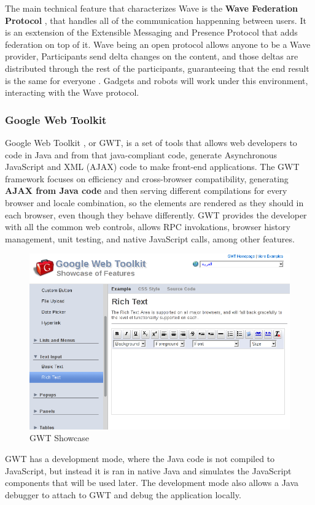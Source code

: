 The main technical feature that characterizes Wave is the \textbf{Wave Federation Protocol} \cite{ref:wave_federated_protocol}, that handles all of the communication happenning between users. It is an esxtension of the Extensible Messaging and Presence Protocol \cite{ref:xmpp} that adds federation on top of it. Wave being an open protocol allows anyone to be a Wave provider, Participants send delta changes on the content, and those deltas are distributed through the rest of the participants, guaranteeing that the end result is the same for everyone \cite{ref:federating_websites_google_wave}. Gadgets and robots will work under this environment, interacting with the Wave protocol.

\subsubsection{Google Web Toolkit}
Google Web Toolkit \cite{ref:gwt}, or GWT, is a set of tools that allows web developers to code in Java and from that java-compliant code, generate Asynchronous JavaScript and XML (AJAX) code to make front-end applications. The GWT framework focuses on efficiency and cross-browser compatibility, generating \textbf{AJAX from Java code} and then serving different compilations for every browser and locale combination, so the elements are rendered as they should in each browser, even though they behave differently. GWT provides the developer with all the common web controls, allows RPC invokations, browser history management, unit testing, and native JavaScript calls, among other features.
\begin{figure}[H]
  \center
    \includegraphics[keepaspectratio, scale=0.4]{Media/Captures/GWT/gwt_showcase.png}
  \caption{GWT Showcase}
  \label{fig:gwt_showcase}
\end{figure}
GWT has a development mode, where the Java code is not compiled to JavaScript, but instead it is ran in native Java and simulates the JavaScript components that will be used later. The development mode also allows a Java debugger to attach to GWT and debug the application locally. 

